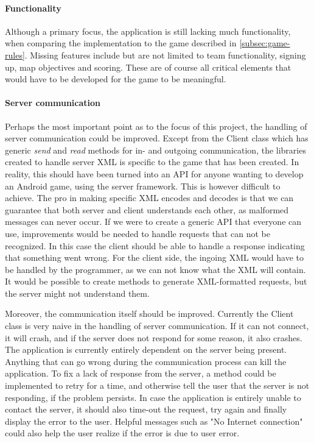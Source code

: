 \paragraph{Functionality}
Although a primary focus, the application is still lacking much functionality, when comparing the implementation to the game described in \ref{subsec:game-rules}. Missing features include but are not limited to team functionality, signing up, map objectives and scoring. These are of course all critical elements that would have to be developed for the game to be meaningful.

\paragraph{Server communication}
Perhaps the most important point as to the focus of this project, the handling of server communication could be improved. Except from the Client class which has generic \textit{send} and \textit{read} methods for in- and outgoing communication, the libraries created to handle server XML is specific to the game that has been created. In reality, this should have been turned into an API for anyone wanting to develop an Android game, using the server framework. This is however difficult to achieve. The pro in making specific XML encodes and decodes is that we can guarantee that both server and client understands each other, as malformed messages can never occur. If we were to create a generic API that everyone can use, improvements would be needed to handle requests that can not be recognized. In this case the client should be able to handle a response indicating that something went wrong. For the client side, the ingoing XML would have to be handled by the programmer, as we can not know what the XML will contain. It would be possible to create methods to generate XML-formatted requests, but the server might not understand them. 

Moreover, the communication itself should be improved. Currently the Client class is very naive in the handling of server communication. If it can not connect, it will crash, and if the server does not respond for some reason, it also crashes. The application is currently entirely dependent on the server being present. Anything that can go wrong during the communication process can kill the application. To fix a lack of response from the server, a method could be implemented to retry for a time, and otherwise tell the user that the server is not responding, if the problem persists. In case the application is entirely unable to contact the server, it should also time-out the request, try again and finally display the error to the user. Helpful messages such as "No Internet connection" could also help the user realize if the error is due to user error.
